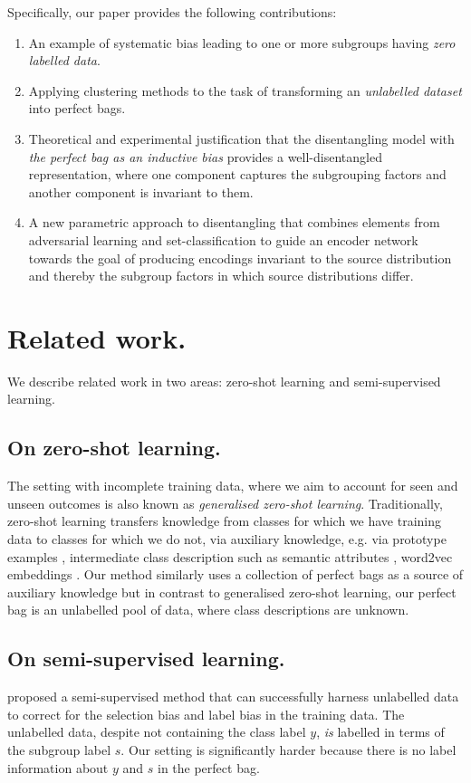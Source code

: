 Specifically, our paper provides the following contributions:
\begin{enumerate}
    \item An example of systematic bias leading to one or more subgroups having \emph{zero labelled data}.
    \item Applying clustering methods to the task of transforming an \emph{unlabelled dataset} into perfect bags.
    \item Theoretical and experimental justification that the disentangling model with \emph{the perfect bag as an inductive bias} provides a well-disentangled representation, where one component captures the subgrouping factors and another component is invariant to them.
    \item A new parametric approach to disentangling that combines elements from adversarial learning and set-classification to guide an encoder network towards the goal of producing encodings invariant to the source distribution and thereby the subgroup factors in which source distributions differ.
\end{enumerate}

\section{Related work.}
We describe related work in two areas: zero-shot learning and semi-su\-per\-vi\-sed learning.

\subsection{On zero-shot learning.}
The setting with incomplete training data, where we aim to account for seen and unseen outcomes is also known as \emph{generalised zero-shot learning}. 
Traditionally, zero-shot learning transfers knowledge from classes for which we have training data to classes for which we do not, via auxiliary knowledge, e.g. via prototype examples \citep{larochelle2008}, intermediate class description such as semantic attributes \citep{lampert2009, xian2018zero}, word2vec embeddings \citep{bucher2019}. 
Our method similarly uses a collection of perfect bags as a source of auxiliary knowledge but in contrast to generalised zero-shot learning, our perfect bag is an unlabelled pool of data, where class descriptions are unknown. 

\subsection{On semi-supervised learning.} 
\citet{wick2019unlocking} proposed a semi-supervised method that can successfully harness unlabelled data to correct for the selection bias and label bias in the training data.
%
The unlabelled data, despite not containing the class label $y$, \emph{is} labelled in terms of the subgroup label $s$. 
%
Our setting is significantly harder because there is no label information about $y$ and $s$ in the perfect bag.

